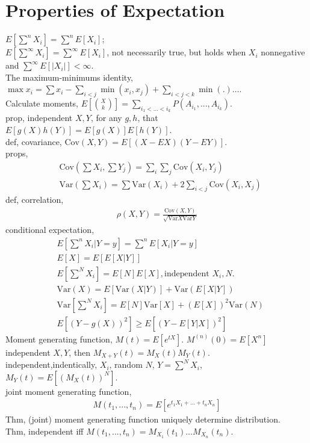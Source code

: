 \documentclass[paper=a4, fontsize=11pt]{scrartcl} %
\numberwithin{equation}{section} %
\numberwithin{figure}{section} %
\numberwithin{table}{section} %
\def \cov {\text{Cov}}
\def \var {\text{Var}}
\begin{document}
\section{Properties of Expectation}
$E[\sum^n X_i] = \sum^n E[X_i]$;\\
$E[\sum^\infty X_i] = \sum^\infty E[X_i]$, not necessarily true, but holds when $X_i$ nonnegative and $\sum^\infty E[|X_i|]<\infty$.\\
The maximum-minimums identity, $\max x_i = \sum x_i - \sum_{i<j} \min(x_i,x_j) +\sum_{i<j<k}\min(.)\dots$.\\
Calculate moments, $E[{X\choose k}] =\sum_{i_1<\dots<i_k} P(A_{i_1},...,A_{i_k})$.\\
prop, independent $X,Y$, for any $g,h$, that $E[g(X)h(Y)]=E[g(X)]E[h(Y)]$.\\
def, covariance, $\cov (X,Y) =E[(X-EX)(Y-EY)]$.\\
props,
\begin{align}
	&\cov(\sum X_i, \sum Y_j) = \sum_i\sum_j \cov(X_i,Y_j) \\
	&\var(\sum X_i) = \sum \var(X_i) + 2\sum_{i<j} \cov(X_i,X_j)
\end{align}
def, correlation,
\begin{align}
	\rho(X,Y) = \frac{\cov(X,Y)}{\sqrt{\var{X}\var{Y}}}
\end{align}
conditional expectation,
\begin{align}
	& E[\sum^n X_i | Y=y] = \sum^n E[X_i|Y=y] \\
	& E[X] = E[E[X|Y]] \\
	& E[\sum^N X_i] = E[N]E[X],\text{independent $X_i,N$.}\\
	& \var(X) = E[\var(X|Y)] + \var(E[X|Y])\\
	& \var[\sum^N X_i] = E[N]\var[X] + (E[X])^2 \var(N)\\
	& E[(Y-g(X))^2] \geq E[(Y-E[Y|X])^2]
\end{align}
Moment generating function, $M(t) = E[e^{tX}]$. $M^{(n)}(0)=E[X^n]$\\
independent $X,Y$, then $M_{X+Y}(t) = M_X(t)M_Y(t)$.\\
independent,indentically, $X_i$, random $N$, $Y=\sum^N X_i$, $M_Y(t) = E[(M_X(t))^N]$.\\
joint moment generating function, 
\begin{align}
	M(t_1,...,t_n) = E[e^{t_1X_1+\dots+t_nX_n}]
\end{align}
Thm, (joint) moment generating function uniquely determine distribution.\\
Thm, independent iff $M(t_1,...,t_n) = M_{X_1}(t_1)\dots M_{X_n}(t_n)$.\\
\end{document}
